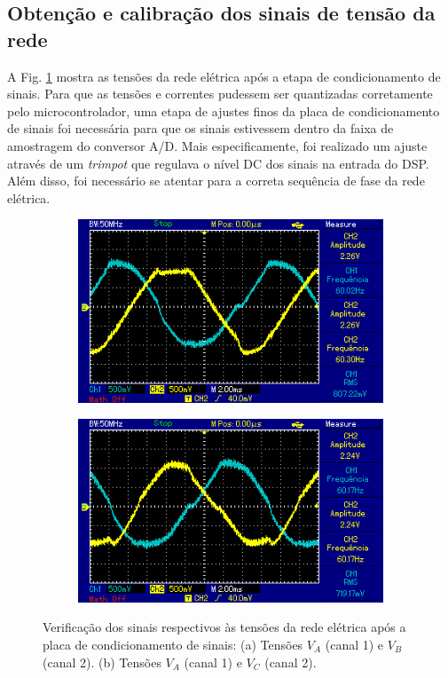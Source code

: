 \subsection{Obtenção e calibração dos sinais de tensão da rede}

A Fig. \ref{fig:res-tensao-va-vb-bc} mostra as tensões da rede elétrica após a etapa de condicionamento de sinais.
Para que as tensões e correntes pudessem ser quantizadas corretamente pelo microcontrolador, 
uma etapa de ajustes finos da placa de condicionamento de sinais foi necessária para que os sinais estivessem dentro da faixa de amostragem do conversor A/D.
Mais especificamente, foi realizado um ajuste através de um \textit{trimpot} que regulava o nível DC dos sinais na entrada do DSP.
Além disso, foi necessário se atentar para a correta sequência de fase da rede elétrica.

\begin{figure}[!hbt]
	\centering
	\begin{subfigure}[b]{0.49\textwidth}
		\centering
		\includegraphics[width=\textwidth]{figuras/resultados_tensao_va_vb.png}
		\caption{}
	\end{subfigure}
	\begin{subfigure}[b]{0.49\textwidth}
		\centering
		\includegraphics[width=\textwidth]{figuras/resultados_tensao_va_vc.png}
		\caption{}
	\end{subfigure}
	\caption{Verificação dos sinais respectivos às tensões da rede elétrica após a placa de condicionamento de sinais: (a) Tensões $V_A$ (canal 1) e $V_B$ (canal 2). (b) Tensões $V_A$ (canal 1) e $V_C$ (canal 2).}
    \label{fig:res-tensao-va-vb-bc}
\end{figure}

